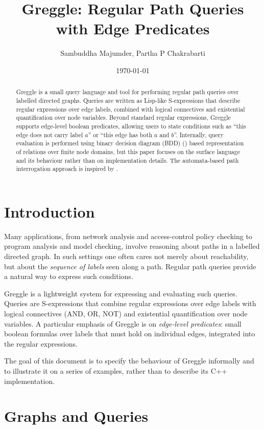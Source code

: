 \documentclass[11pt]{article}
\title{Greggle: Regular Path Queries with Edge Predicates}
\author{Sambuddha Majumder, Partha P Chakrabarti}
\date{\today}
\begin{document}
\maketitle

\begin{abstract}
Greggle is a small query language and tool for performing regular path
queries over labelled directed graphs.  Queries are written as Lisp-like S-expressions
that describe regular expressions over edge labels, combined with
logical connectives and existential quantification over node
variables.  Beyond standard regular expressions, Greggle supports
edge-level boolean predicates, allowing users to state conditions such
as ``this edge does not carry label $a$'' or ``this edge has both $a$
and $b$''.  Internally, query evaluation is performed using binary decision 
diagram (BDD) (\cite{bryant1986graph}) based representation of relations over finite node domains, 
but this paper focuses on the surface language and its behaviour rather 
than on implementation details. The automata-based path interrogation 
approach is inspired by \cite{vardi2007automata}.
\end{abstract}

\section{Introduction}
 
Many applications, from network analysis and access-control policy
checking to program analysis and model checking, involve reasoning
about paths in a labelled directed graph.  In such settings one often
cares not merely about reachability, but about the \emph{sequence of
labels} seen along a path.  Regular path queries provide a natural
way to express such conditions.

Greggle is a lightweight system for expressing and evaluating such
queries.  Queries are S-expressions that combine regular expressions over
edge labels with logical connectives (AND, OR, NOT) and existential
quantification over node variables.  A particular emphasis of Greggle
is on \emph{edge-level predicates}: small boolean formulas over labels
that must hold on individual edges, integrated into the regular
expressions.

The goal of this document is to specify the behaviour of Greggle
informally and to illustrate it on a series of examples, rather than
to describe its C++ implementation.

\section{Graphs and Queries}
\end{document}
